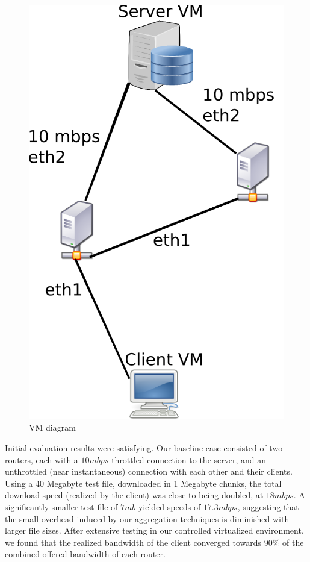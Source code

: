 \documentclass[12pt]{article}
\begin{document}
	\begin{figure}[H]
		\centering
		\includegraphics[keepaspectratio=true,scale=0.3]{InterfaceSetup.png}
		\caption{VM diagram}
		\label{fig:awesome_image}
	\end{figure}

	Initial evaluation results were satisfying. Our baseline case consisted of two routers, each with a $10 mbps$ throttled connection to the server, and an unthrottled (near instantaneous) connection with each other and their clients. Using a 40 Megabyte test file, downloaded in 1 Megabyte chunks, the total download speed (realized by the client) was close to being doubled, at $18 mbps$. A significantly smaller test file of $7 mb$ yielded speeds of $17.3 mbps$, suggesting that the small overhead induced by our aggregation techniques is diminished with larger file sizes. After extensive testing in our controlled virtualized environment, we found that the realized bandwidth of the client converged towards $90\%$ of the combined offered bandwidth of each router.
\end{document}
